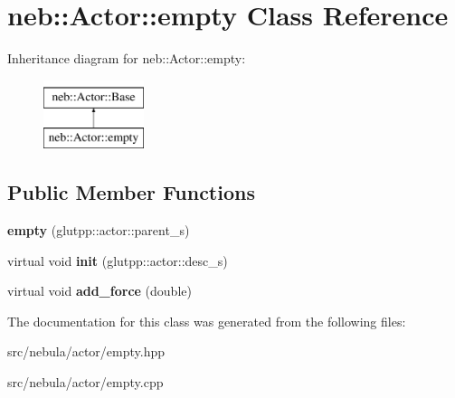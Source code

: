 \hypertarget{classneb_1_1Actor_1_1empty}{\section{neb\-:\-:\-Actor\-:\-:empty \-Class \-Reference}
\label{classneb_1_1Actor_1_1empty}
}
\-Inheritance diagram for neb\-:\-:\-Actor\-:\-:empty\-:\begin{figure}[H]
\begin{center}
\leavevmode
\includegraphics[height=2.000000cm]{classneb_1_1Actor_1_1empty}
\end{center}
\end{figure}
\subsection*{\-Public \-Member \-Functions}
\begin{DoxyCompactItemize}
\item 
\hypertarget{classneb_1_1Actor_1_1empty_a986bad0e65988e8561985a8500cc2bdb}{{\bfseries empty} (glutpp\-::actor\-::parent\-\_\-s)}\label{classneb_1_1Actor_1_1empty_a986bad0e65988e8561985a8500cc2bdb}

\item 
\hypertarget{classneb_1_1Actor_1_1empty_af37fc36906e3f7af421bd444a0378b0f}{virtual void {\bfseries init} (glutpp\-::actor\-::desc\-\_\-s)}\label{classneb_1_1Actor_1_1empty_af37fc36906e3f7af421bd444a0378b0f}

\item 
\hypertarget{classneb_1_1Actor_1_1empty_a473dcef1b8de90a5178e506406e5f383}{virtual void {\bfseries add\-\_\-force} (double)}\label{classneb_1_1Actor_1_1empty_a473dcef1b8de90a5178e506406e5f383}

\end{DoxyCompactItemize}


\-The documentation for this class was generated from the following files\-:\begin{DoxyCompactItemize}
\item 
src/nebula/actor/empty.\-hpp\item 
src/nebula/actor/empty.\-cpp\end{DoxyCompactItemize}
